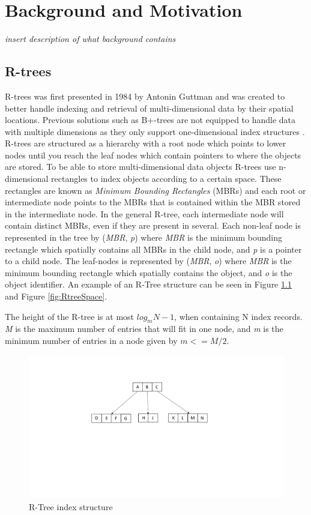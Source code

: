 \chapter{Background and Motivation}
\label{chap:background}

\emph{insert description of what background contains}

\section{R-trees}
R-trees was first presented in 1984 by Antonin Guttman\cite{r-tree} and was created to better handle indexing and retrieval of multi-dimensional data by their spatial locations. Previous solutions such as B+-trees are not equipped to handle data with multiple dimensions as they only support one-dimensional index structures \cite{ComparisonOfAdvancedTree}. R-trees are structured as a hierarchy with a root node which points to lower nodes until you reach the leaf nodes which contain pointers to where the objects are stored. To be able to store multi-dimensional data objects R-trees use n-dimensional rectangles to index objects according to a certain space. These rectangles are known as \emph{Minimum Bounding Rectangles} (MBRs) and each root or intermediate node points to the MBRs that is contained within the MBR stored in the intermediate node. In the general R-tree, each intermediate node will contain distinct MBRs, even if they are present in several. Each non-leaf node is represented in the tree by (\emph{MBR},  \emph{p}) where \emph{MBR} is the minimum bounding rectangle which spatially contains all MBRs in the child node, and \emph{p} is a pointer to a child node. The leaf-nodes is represented by (\emph{MBR}, \emph{o}) where \emph{MBR} is the minimum bounding rectangle which spatially contains the object, and \emph{o} is the object identifier. An example of an R-Tree structure can be seen in Figure \ref{fig:RTree} and Figure \ref{fig:RtreeSpace}.

The height of the R-tree is at most \(log_mN-1\), when containing N index records. \emph{M} is the maximum number of entries that will fit in one node, and \emph{m} is the minimum number of entries in a node given by \(m <= M/2\).

\begin{figure}[ht]
    \centering
    \includegraphics[scale=0.4]{figures/RTree.pdf}
    \caption{R-Tree index structure}
    \label{fig:RTree}
\end{figure}

